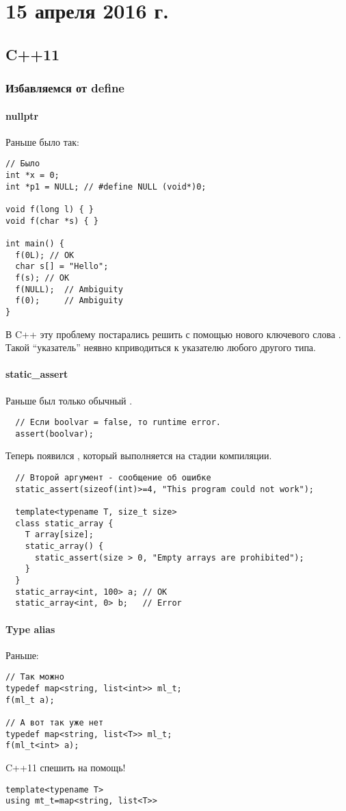 \section{15 апреля 2016 г.}

\subsection{C++11}

\subsubsection{Избавляемся от define}

\paragraph{nullptr}
Раньше было так:
\begin{verbatim}
// Было
int *x = 0;
int *p1 = NULL; // #define NULL (void*)0;

void f(long l) { }
void f(char *s) { }

int main() {
  f(0L); // OK
  char s[] = "Hello";
  f(s); // OK
  f(NULL);  // Ambiguity
  f(0);     // Ambiguity
}
\end{verbatim}
В C++ эту проблему постарались решить с помощью нового ключевого слова . Такой ``указатель'' неявно кприводиться к указателю любого другого типа.

\paragraph{static\_assert}
Раньше был только обычный .
\begin{verbatim}
  // Если boolvar = false, то runtime error.
  assert(boolvar);
\end{verbatim}
Теперь появился , который выполняется на стадии компиляции.
\begin{verbatim}
  // Второй аргумент - сообщение об ошибке
  static_assert(sizeof(int)>=4, "This program could not work");

  template<typename T, size_t size>
  class static_array {
    T array[size];
    static_array() {
      static_assert(size > 0, "Empty arrays are prohibited");
    }
  }
  static_array<int, 100> a; // OK
  static_array<int, 0> b;   // Error
\end{verbatim}

\paragraph{Type alias}
Раньше:
\begin{verbatim}
// Так можно
typedef map<string, list<int>> ml_t;
f(ml_t a);

// А вот так уже нет
typedef map<string, list<T>> ml_t;
f(ml_t<int> a);
\end{verbatim}
C++11 спешить на помощь!
\begin{verbatim}
template<typename T>
using mt_t=map<string, list<T>>
\end{verbatim}

